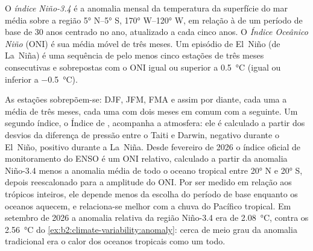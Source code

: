 \begin{definition}\label{def:b2:climate-variability:oni}
O \emph{índice Niño-3.4} é a anomalia mensal da temperatura da superfície
do mar média sobre a região \ang{5} N--\ang{5} S, \ang{170} W--\ang{120} W, em relação à
 de um período de base de 30 anos centrado no ano, atualizado a cada cinco anos. O
\emph{Índice Oceânico Niño} (ONI) é sua média móvel de três meses. Um
episódio de El~Niño (de La~Niña) é uma sequência de pelo menos cinco estações de três meses consecutivas e sobrepostas
com o ONI igual ou superior a \qty{+0.5}{\celsius} (igual ou inferior a \qty{-0.5}{\celsius}).
\end{definition}

As estações sobrepõem-se: DJF, JFM, FMA e assim por diante, cada uma a média de três meses, cada uma com dois
meses em comum com a seguinte. Um segundo índice, o Índice de , acompanha a atmosfera: ele
é calculado a partir dos desvios da diferença de pressão entre o Taiti e Darwin, negativo
durante o El~Niño, positivo durante a La~Niña. Desde fevereiro de 2026 o índice oficial de monitoramento do
ENSO é um ONI relativo, calculado a partir da anomalia Niño-3.4 menos a anomalia média de todo o
oceano tropical entre \ang{20} N e \ang{20} S, depois reescalonado para a amplitude do ONI. Por ser
medido em relação aos trópicos inteiros, ele depende menos da escolha do período de base enquanto os oceanos
aquecem, e relaciona-se melhor com a chuva do Pacífico tropical. Em setembro de 2026 a
anomalia relativa da região Niño-3.4 era de \qty{2.08}{\celsius}, contra os \qty{2.56}{\celsius}
do \cref{ex:b2:climate-variability:anomaly}: cerca de meio grau da anomalia tradicional era o
calor dos oceanos tropicais como um todo.

